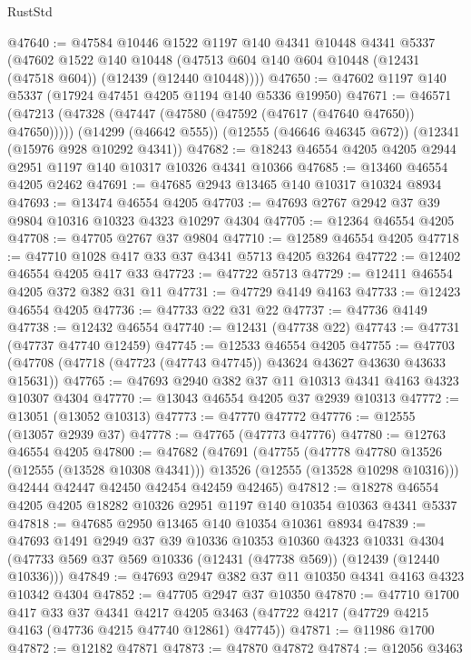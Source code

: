 \begin{lexlean}{RustStd}
\begin{coremodule}
@47640 := @47584
    @10446
    @1522
    @1197
    @140
    @4341
    @10448
    @4341
    @5337
    (@47602
      @1522
      @140
      @10448
      (@47513 @604 @140 @604 @10448 (@12431 (@47518 @604)) (@12439 (@12440 @10448))))
@47650 := @47602 @1197 @140 @5337 (@17924 @47451 @4205 @1194 @140 @5336 @19950)
@47671 := @46571
    (@47213 (@47328 (@47447 (@47580 (@47592 (@47617 (@47640 @47650)) @47650)))))
    (@14299 (@46642 @555))
    (@12555 (@46646 @46345 @672))
    (@12341 (@15976 @928 @10292 @4341))
@47682 := @18243 @46554 @4205 @4205 @2944 @2951 @1197 @140 @10317 @10326 @4341 @10366
@47685 := @13460 @46554 @4205 @2462
@47691 := @47685 @2943 @13465 @140 @10317 @10324 @8934
@47693 := @13474 @46554 @4205
@47703 := @47693 @2767 @2942 @37 @39 @9804 @10316 @10323 @4323 @10297 @4304
@47705 := @12364 @46554 @4205
@47708 := @47705 @2767 @37 @9804
@47710 := @12589 @46554 @4205
@47718 := @47710 @1028 @417 @33 @37 @4341 @5713 @4205 @3264
@47722 := @12402 @46554 @4205 @417 @33
@47723 := @47722 @5713
@47729 := @12411 @46554 @4205 @372 @382 @31 @11
@47731 := @47729 @4149 @4163
@47733 := @12423 @46554 @4205
@47736 := @47733 @22 @31 @22
@47737 := @47736 @4149
@47738 := @12432 @46554
@47740 := @12431 (@47738 @22)
@47743 := @47731 (@47737 @47740 @12459)
@47745 := @12533 @46554 @4205
@47755 := @47703 (@47708 (@47718 (@47723 (@47743 @47745)) @43624 @43627 @43630 @43633 @15631))
@47765 := @47693 @2940 @382 @37 @11 @10313 @4341 @4163 @4323 @10307 @4304
@47770 := @13043 @46554 @4205 @37 @2939 @10313
@47772 := @13051 (@13052 @10313)
@47773 := @47770 @47772
@47776 := @12555 (@13057 @2939 @37)
@47778 := @47765 (@47773 @47776)
@47780 := @12763 @46554 @4205
@47800 := @47682
    (@47691
      (@47755
        (@47778 @47780 @13526 (@12555 (@13528 @10308 @4341)))
        @13526
        (@12555 (@13528 @10298 @10316)))
      @42444
      @42447
      @42450
      @42454
      @42459
      @42465)
@47812 := @18278 @46554 @4205 @4205 @18282 @10326 @2951 @1197 @140 @10354 @10363 @4341 @5337
@47818 := @47685 @2950 @13465 @140 @10354 @10361 @8934
@47839 := @47693
    @1491
    @2949
    @37
    @39
    @10336
    @10353
    @10360
    @4323
    @10331
    @4304
    (@47733 @569 @37 @569 @10336 (@12431 (@47738 @569)) (@12439 (@12440 @10336)))
@47849 := @47693 @2947 @382 @37 @11 @10350 @4341 @4163 @4323 @10342 @4304
@47852 := @47705 @2947 @37 @10350
@47870 := @47710
    @1700
    @417
    @33
    @37
    @4341
    @4217
    @4205
    @3463
    (@47722 @4217 (@47729 @4215 @4163 (@47736 @4215 @47740 @12861) @47745))
@47871 := @11986 @1700
@47872 := @12182 @47871
@47873 := @47870 @47872
@47874 := @12056 @3463

\end{coremodule}
\end{lexlean}
